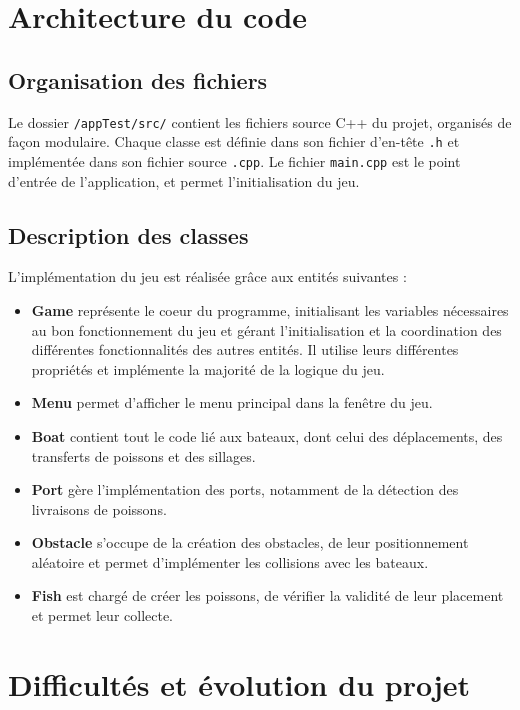 \documentclass[a4paper,12pt]{article}
\begin{document}
\section{Architecture du code}

\subsection{Organisation des fichiers}
Le dossier \texttt{/appTest/src/} contient les fichiers source C++ du projet, organisés de façon modulaire. Chaque classe est définie dans son fichier d'en-tête \texttt{.h} et implémentée dans son fichier source \texttt{.cpp}. Le fichier \texttt{main.cpp} est le point d'entrée de l'application, et permet l'initialisation du jeu.

\subsection{Description des classes}

L'implémentation du jeu est réalisée grâce aux entités suivantes :

\begin{itemize}
    \item \textbf{Game} représente le coeur du programme, initialisant les variables nécessaires au bon fonctionnement du jeu et gérant l'initialisation et la coordination des différentes fonctionnalités des autres entités. Il utilise leurs différentes propriétés et implémente la majorité de la logique du jeu.
    \item \textbf{Menu} permet d'afficher le menu principal dans la fenêtre du jeu.
    \item \textbf{Boat} contient tout le code lié aux bateaux, dont celui des déplacements, des transferts de poissons et des sillages.
    \item \textbf{Port} gère l'implémentation des ports, notamment de la détection des livraisons de poissons.
    \item \textbf{Obstacle} s'occupe de la création des obstacles, de leur positionnement aléatoire et permet d'implémenter les collisions avec les bateaux.
    \item \textbf{Fish} est chargé de créer les poissons, de vérifier la validité de leur placement et permet leur collecte.
    
    
\end{itemize}

\section{Difficultés et évolution du projet}
\end{document}
